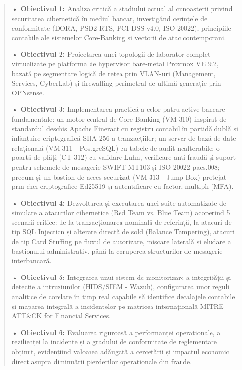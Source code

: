 \documentclass[
]{article}
\begin{document}
\begin{quote}
\textbf{• Obiectivul 1:} Analiza critică a stadiului actual al
cunoașterii privind securitatea cibernetică în mediul bancar,
investigând cerințele de conformitate (DORA, PSD2 RTS, PCI-DSS v4.0, ISO
20022), principiile contabile ale sistemelor Core-Banking și vectorii de
atac contemporani.

\textbf{• Obiectivul 2:} Proiectarea unei topologii de laborator complet
virtualizate pe platforma de hypervisor bare-metal Proxmox VE 9.2,
bazată pe segmentare logică de rețea prin VLAN-uri (Management,
Services, CyberLab) și firewalling perimetral de ultimă generație prin
OPNsense.

\textbf{• Obiectivul 3:} Implementarea practică a celor patru active
bancare fundamentale: un motor central de Core-Banking (VM 310) inspirat
de standardul deschis Apache Fineract cu registru contabil în partidă
dublă și înlănțuire criptografică SHA-256 a tranzacțiilor; un server de
bază de date relațională (VM 311 - PostgreSQL) cu tabele de audit
nealterabile; o poartă de plăți (CT 312) cu validare Luhn, verificare
anti-fraudă și suport pentru schemele de mesagerie SWIFT MT103 și ISO
20022 pacs.008; precum și un bastion de acces securizat (VM 313 -
Jump-Box) protejat prin chei criptografice Ed25519 și autentificare cu
factori multipli (MFA).

\textbf{• Obiectivul 4:} Dezvoltarea și executarea unei suite
automatizate de simulare a atacurilor cibernetice (Red Team vs. Blue
Team) acoperind 5 scenarii critice: de la tranzacționarea nominală de
referință, la atacuri de tip SQL Injection și alterare directă de sold
(Balance Tampering), atacuri de tip Card Stuffing pe fluxul de
autorizare, mișcare laterală și eludare a bastionului administrativ,
până la coruperea structurilor de mesagerie interbancară.

\textbf{• Obiectivul 5:} Integrarea unui sistem de monitorizare a
integrității și detecție a intruziunilor (HIDS/SIEM - Wazuh),
configurarea unor reguli analitice de corelare în timp real capabile să
identifice decalajele contabile și maparea integrală a incidentelor pe
matricea internațională MITRE ATT\&CK for Financial Services.

\textbf{• Obiectivul 6:} Evaluarea riguroasă a performanței
operaționale, a rezilienței la incidente și a gradului de conformitate
de reglementare obținut, evidențiind valoarea adăugată a cercetării și
impactul economic direct asupra diminuării pierderilor operaționale din
fraude.
\end{quote}
\end{document}
